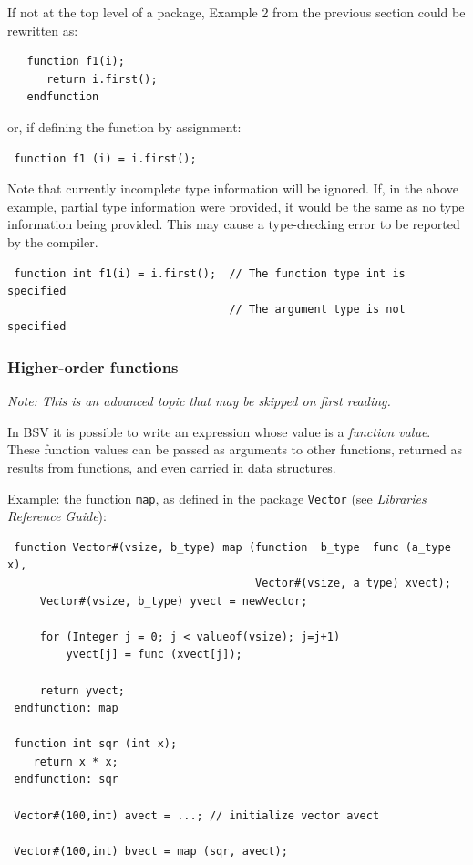 \documentclass[twoside,letterpaper]{article}
\newcommand{\LibRefGuide}{\emph{Libraries Reference Guide}}
\newcommand{\BSV}{BSV}
\newcommand{\te}[1]{\texttt{#1}}
\begin{document}

If not at the top level of a package, Example 2 from  the
previous section could be rewritten as:
\begin{verbatim}
   function f1(i);
      return i.first();
   endfunction
\end{verbatim}
or, if  defining the function by assignment:
\begin{verbatim}
 function f1 (i) = i.first();
\end{verbatim}

Note that currently incomplete type information will be ignored.  If,
in the above example, partial type information were provided, it would
be the same as no type information being provided.  This may cause a
type-checking  error to be reported by the compiler.
\begin{verbatim}
 function int f1(i) = i.first();  // The function type int is specified
                                  // The argument type is not specified
\end{verbatim}


\subsubsection{Higher-order functions}

\label{sec-hofs}


\emph{Note: This is an advanced topic that may be skipped on first reading.}

In {\BSV} it is possible to write an expression whose value is a
{\emph{function value}}.  These function values can be passed as
arguments to other functions, returned as results from functions, and
even carried in data structures.  

Example: the function \te{map}, as defined in the package \te{Vector}
(see \LibRefGuide):

\begin{verbatim}
 function Vector#(vsize, b_type) map (function  b_type  func (a_type x),
                                      Vector#(vsize, a_type) xvect);
     Vector#(vsize, b_type) yvect = newVector;

     for (Integer j = 0; j < valueof(vsize); j=j+1)
         yvect[j] = func (xvect[j]);

     return yvect;
 endfunction: map

 function int sqr (int x);
    return x * x;
 endfunction: sqr

 Vector#(100,int) avect = ...; // initialize vector avect

 Vector#(100,int) bvect = map (sqr, avect);
\end{verbatim}
\end{document}
